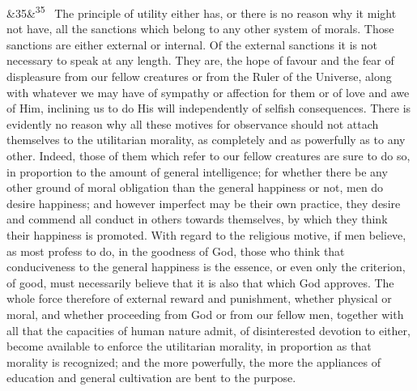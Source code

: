 \documentclass[12pt]{article}
\newcommand{\para}[1][]{\par\noindent\ifx&#1&\else\textsuperscript{\footnotesize #1}~\fi}
\begin{document}
\para[35] The principle of utility either has, or there is no reason why it might not have, all the sanctions which belong to any other system of morals. Those sanctions are either external or internal. Of the external sanctions it is not necessary to speak at any length. They are, the hope of favour and the fear of displeasure from our fellow creatures or from the Ruler of the Universe, along with whatever we may have of sympathy or affection for them or of love and awe of Him, inclining us to do His will independently of selfish consequences. There is evidently no reason why all these motives for observance should not attach themselves to the utilitarian morality, as completely and as powerfully as to any other. Indeed, those of them which refer to our fellow creatures are sure to do so, in proportion to the amount of general intelligence; for whether there be any other ground of moral obligation than the general happiness or not, men do desire happiness; and however imperfect may be their own practice, they desire and commend all conduct in others towards themselves, by which they think their happiness is promoted. With regard to the religious motive, if men believe, as most profess to do, in the goodness of God, those who think that conduciveness to the general happiness is the essence, or even only the criterion, of good, must necessarily believe that it is also that which God approves. The whole force therefore of external reward and punishment, whether physical or moral, and whether proceeding from God or from our fellow men, together with all that the capacities of human nature admit, of disinterested devotion to either, become available to enforce the utilitarian morality, in proportion as that morality is recognized; and the more powerfully, the more the appliances of education and general cultivation are bent to the purpose.
\end{document}

